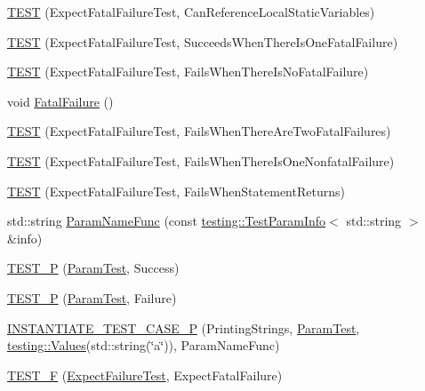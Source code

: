 \begin{DoxyCompactItemize}
\item 
\mbox{\hyperlink{googletest-output-test___8cc_ac6646aa5f6d4ea21c0528259118754a4}{T\+E\+ST}} (Expect\+Fatal\+Failure\+Test, Can\+Reference\+Local\+Static\+Variables)
\item 
\mbox{\hyperlink{googletest-output-test___8cc_a0d894cc9ae86412b4c156748602a23a7}{T\+E\+ST}} (Expect\+Fatal\+Failure\+Test, Succeeds\+When\+There\+Is\+One\+Fatal\+Failure)
\item 
\mbox{\hyperlink{googletest-output-test___8cc_af8e8545243605b2ba121e253ec48785e}{T\+E\+ST}} (Expect\+Fatal\+Failure\+Test, Fails\+When\+There\+Is\+No\+Fatal\+Failure)
\item 
void \mbox{\hyperlink{googletest-output-test___8cc_acdca9b16622e8a506a39240c8809af38}{Fatal\+Failure}} ()
\item 
\mbox{\hyperlink{googletest-output-test___8cc_a4fd11a245bf0e8eb46d78c8dc14c730e}{T\+E\+ST}} (Expect\+Fatal\+Failure\+Test, Fails\+When\+There\+Are\+Two\+Fatal\+Failures)
\item 
\mbox{\hyperlink{googletest-output-test___8cc_a35fafc42558ee14c42320b359c270026}{T\+E\+ST}} (Expect\+Fatal\+Failure\+Test, Fails\+When\+There\+Is\+One\+Nonfatal\+Failure)
\item 
\mbox{\hyperlink{googletest-output-test___8cc_aca5344af5eed2eefc512c555acbe5511}{T\+E\+ST}} (Expect\+Fatal\+Failure\+Test, Fails\+When\+Statement\+Returns)
\item 
std\+::string \mbox{\hyperlink{googletest-output-test___8cc_a61c686cb1c0f8f19c100ff975482ec7a}{Param\+Name\+Func}} (const \mbox{\hyperlink{structtesting_1_1TestParamInfo}{testing\+::\+Test\+Param\+Info}}$<$ std\+::string $>$ \&info)
\item 
\mbox{\hyperlink{googletest-output-test___8cc_a4e7fc7682f9a8a168b78d53b05fab8bf}{T\+E\+S\+T\+\_\+P}} (\mbox{\hyperlink{classParamTest}{Param\+Test}}, Success)
\item 
\mbox{\hyperlink{googletest-output-test___8cc_a0847a99be23b980115e2dd88a1bd60cc}{T\+E\+S\+T\+\_\+P}} (\mbox{\hyperlink{classParamTest}{Param\+Test}}, Failure)
\item 
\mbox{\hyperlink{googletest-output-test___8cc_a00b51dcd9ffaced8ceefcc4caf87c334}{I\+N\+S\+T\+A\+N\+T\+I\+A\+T\+E\+\_\+\+T\+E\+S\+T\+\_\+\+C\+A\+S\+E\+\_\+P}} (Printing\+Strings, \mbox{\hyperlink{classParamTest}{Param\+Test}}, \mbox{\hyperlink{namespacetesting_a8209ef59db08b8ad4beed30d8d6e6a88}{testing\+::\+Values}}(std\+::string(\char`\"{}a\char`\"{})), Param\+Name\+Func)
\item 
\mbox{\hyperlink{googletest-output-test___8cc_ae7459e6b9516821fd0e77eb3aa9b7413}{T\+E\+S\+T\+\_\+F}} (\mbox{\hyperlink{classExpectFailureTest}{Expect\+Failure\+Test}}, Expect\+Fatal\+Failure)

\end{DoxyCompactItemize}
